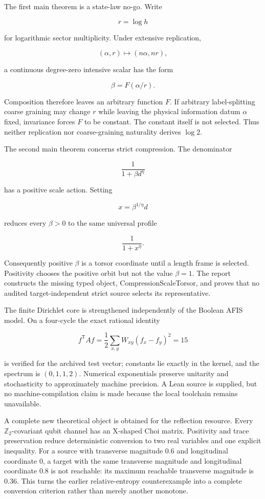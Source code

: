 \documentclass[11pt,a4paper,openany]{report}
\begin{document}
The first main theorem is a state-law no-go. Write

\[
r=\log h
\]

for logarithmic sector multiplicity. Under extensive replication,

\[
(\alpha,r)\longmapsto(n\alpha,nr),
\]

a continuous degree-zero intensive scalar has the form

\[
\beta=F(\alpha/r).
\]

Composition therefore leaves an arbitrary function \(F\). If arbitrary label-splitting coarse graining may change \(r\) while leaving the physical information datum \(\alpha\) fixed, invariance forces \(F\) to be constant. The constant itself is not selected. Thus neither replication nor coarse-graining naturality derives \(\log2\).

The second main theorem concerns strict compression. The denominator

\[
\frac1{1+\beta d^\eta}
\]

has a positive scale action. Setting

\[
x=\beta^{1/\eta}d
\]

reduces every \(\beta>0\) to the same universal profile

\[
\frac1{1+x^\eta}.
\]

Consequently positive \(\beta\) is a torsor coordinate until a length frame is selected. Positivity chooses the positive orbit but not the value \(\beta=1\). The report constructs the missing typed object, CompressionScaleTorsor, and proves that no audited target-independent strict source selects its representative.

The finite Dirichlet core is strengthened independently of the Boolean AFIS model. On a four-cycle the exact rational identity

\[
f^\mathsf TA f
=
\frac12\sum_{x,y}W_{xy}(f_x-f_y)^2
=15
\]

is verified for the archived test vector; constants lie exactly in the kernel, and the spectrum is \((0,1,1,2)\). Numerical exponentials preserve unitarity and stochasticity to approximately machine precision. A Lean source is supplied, but no machine-compilation claim is made because the local toolchain remains unavailable.

A complete new theoretical object is obtained for the reflection resource. Every \(\mathbb Z_2\)-covariant qubit channel has an X-shaped Choi matrix. Positivity and trace preservation reduce deterministic conversion to two real variables and one explicit inequality. For a source with transverse magnitude \(0.6\) and longitudinal coordinate \(0\), a target with the same transverse magnitude and longitudinal coordinate \(0.8\) is not reachable: its maximum reachable transverse magnitude is \(0.36\). This turns the earlier relative-entropy counterexample into a complete conversion criterion rather than merely another monotone.
\end{document}
